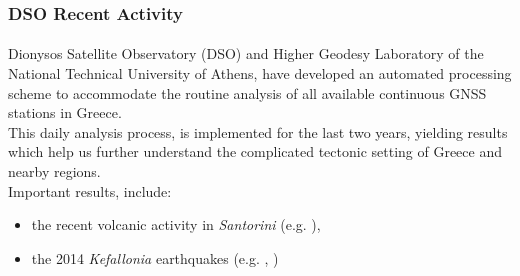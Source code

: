 \documentclass{beamer}
\begin{document}
\begin{frame}\frametitle{DSO Recent Activity}\framesubtitle{}

  Dionysos Satellite Observatory (DSO) and Higher Geodesy Laboratory of the 
  National Technical University of Athens, have developed an automated processing
  scheme to accommodate the routine analysis of all available continuous GNSS 
  stations in Greece.
  \\
  This daily analysis process, is implemented for the last two years, yielding 
  results which help us further understand the complicated tectonic setting of 
  Greece and nearby regions.
  \\
  Important results, include:
  \begin{itemize}
    \item the recent volcanic activity in \emph{Santorini} (e.g. \cite{papoutsis}),
    \item the 2014 \emph{Kefallonia} earthquakes (e.g. \cite{sarkefalonia}, \cite{sakkas})
  \end{itemize}


\end{frame}
\end{document}
